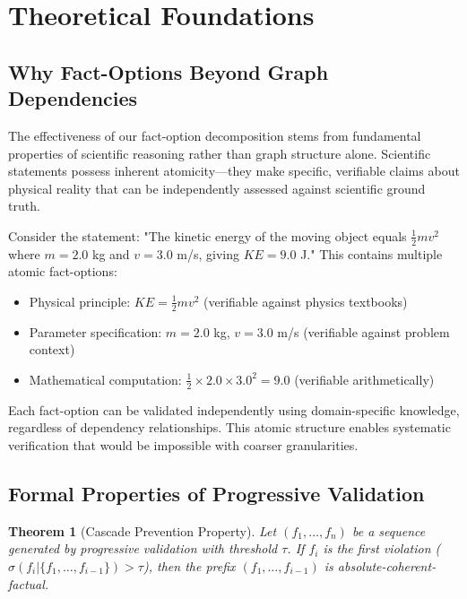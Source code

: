 \documentclass{uai2026} %
\theoremstyle{remark}
\theoremstyle{plain}
\newtheorem{theorem}{Theorem} %
\theoremstyle{definition}
\begin{document}


\clearpage
\appendix
\renewcommand{\thesection}{\Alph{section}}
\renewcommand{\thesubsection}{\thesection.\arabic{subsection}}
\renewcommand{\thesubsubsection}{\thesubsection.\arabic{subsubsection}}
\section{Theoretical Foundations}

\subsection{Why Fact-Options Beyond Graph Dependencies}

The effectiveness of our fact-option decomposition stems from fundamental properties of scientific reasoning rather than graph structure alone. Scientific statements possess inherent atomicity—they make specific, verifiable claims about physical reality that can be independently assessed against scientific ground truth.

Consider the statement: "The kinetic energy of the moving object equals $\frac{1}{2}mv^2$ where $m=2.0$ kg and $v=3.0$ m/s, giving $KE = 9.0$ J." This contains multiple atomic fact-options:
\begin{itemize}
    \item Physical principle: $KE = \frac{1}{2}mv^2$ (verifiable against physics textbooks)
    \item Parameter specification: $m = 2.0$ kg, $v = 3.0$ m/s (verifiable against problem context)
    \item Mathematical computation: $\frac{1}{2} \times 2.0 \times 3.0^2 = 9.0$ (verifiable arithmetically)
\end{itemize}

Each fact-option can be validated independently using domain-specific knowledge, regardless of dependency relationships. This atomic structure enables systematic verification that would be impossible with coarser granularities.

\subsection{Formal Properties of Progressive Validation}

\begin{theorem}[Cascade Prevention Property]
Let $(f_1, \ldots, f_n)$ be a sequence generated by progressive validation with threshold $\tau$. If $f_i$ is the first violation ($\sigma(f_i | \{f_1, \ldots, f_{i-1}\}) > \tau$), then the prefix $(f_1, \ldots, f_{i-1})$ is absolute-coherent-factual.
\end{theorem}
\end{document}
